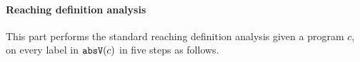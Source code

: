 \paragraph{Reaching definition analysis}
This part performs the standard reaching definition analysis given a program $c$, 
on 
every label in $\mathtt{abs}{\mathtt{V}}(c)$ in five steps as follows.
